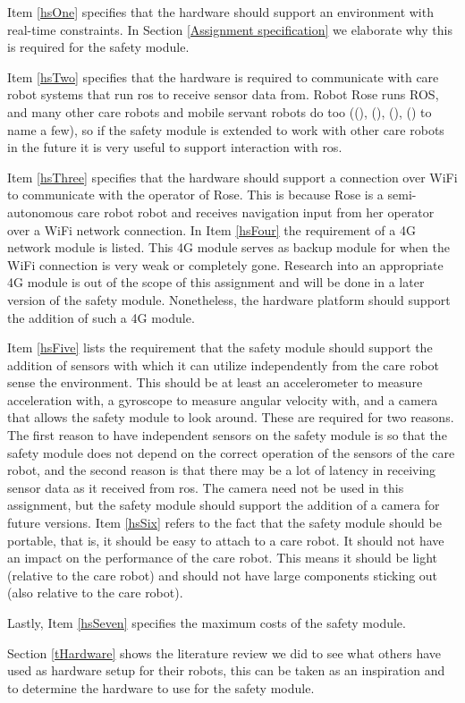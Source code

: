 \documentclass[12pt]{scrreprt}
\begin{document}
Item \ref{hsOne} specifies that the hardware should support an environment with real-time constraints. In Section \ref{Assignment specification} we elaborate why this is required for the safety module.
\par
Item \ref{hsTwo} specifies that the hardware is required to communicate with care robot systems that run \acrlong{ros} to receive sensor data from. Robot Rose runs ROS, and many other care robots and mobile servant robots do too ((\cite{human-robot}), (\cite{spencer}), (\cite{delgado}), (\cite{dimitris}) to name a few), so if the safety module is extended to work with other care robots in the future it is very useful to support interaction with \acrshort{ros}. 
\par
Item \ref{hsThree} specifies that the hardware should support a connection over WiFi to communicate with the operator of Rose. This is because Rose is a semi-autonomous care robot robot and receives navigation input from her operator over a WiFi network connection. In Item \ref{hsFour} the requirement of a 4G network module is listed. This 4G module serves as backup module for when the WiFi connection is very weak or completely gone. Research into an appropriate 4G module is out of the scope of this assignment and will be done in a later version of the safety module. Nonetheless, the hardware platform should support the addition of such a 4G module.
\par
Item \ref{hsFive} lists the requirement that the safety module should support the addition of sensors with which it can utilize independently from the care robot sense the environment. This should be at least an accelerometer to measure acceleration with, a gyroscope to measure angular velocity with, and a camera that allows the safety module to look around. These are required for two reasons. The first reason to have independent sensors on the safety module is so that the safety module does not depend on the correct operation of the sensors of the care robot, and the second reason is that there may be a lot of latency in receiving sensor data as it received from \acrshort{ros}. The camera need not be used in this assignment, but the safety module should support the addition of a camera for future versions. 
Item \ref{hsSix} refers to the fact that the safety module should be portable, that is, it should be easy to attach to a care robot. It should not have an impact on the performance of the care robot. This means it should be light (relative to the care robot) and should not have large components sticking out (also relative to the care robot).
\par
Lastly, Item \ref{hsSeven} specifies the maximum costs of the safety module.
\par
Section \ref{tHardware} shows the literature review we did to see what others have used as hardware setup for their robots, this can be taken as an inspiration and to determine the hardware to use for the safety module.
\end{document}

